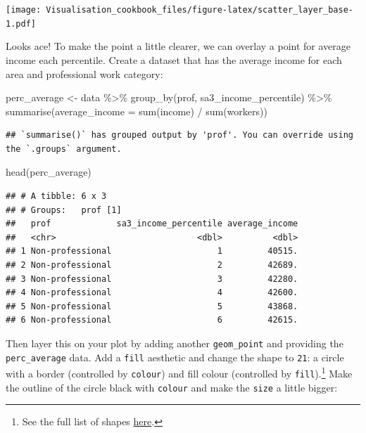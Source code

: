 \documentclass[
]{book}
\newenvironment{Shaded}{\begin{snugshade}}{\end{snugshade}}
\newcommand{\AttributeTok}[1]{\textcolor[rgb]{0.77,0.63,0.00}{#1}}
\newcommand{\FunctionTok}[1]{\textcolor[rgb]{0.00,0.00,0.00}{#1}}
\newcommand{\NormalTok}[1]{#1}
\newcommand{\OtherTok}[1]{\textcolor[rgb]{0.56,0.35,0.01}{#1}}
\newcommand{\SpecialCharTok}[1]{\textcolor[rgb]{0.00,0.00,0.00}{#1}}
\begin{document}
\texttt{[image: Visualisation\_cookbook\_files/figure-latex/scatter\_layer\_base-1.pdf]}

Looks ace! To make the point a little clearer, we can overlay a point for average income each percentile. Create a dataset that has the average income for each area and professional work category:

\begin{Shaded}
\begin{Highlighting}[]
\NormalTok{perc\_average }\OtherTok{\textless{}{-}}\NormalTok{ data }\SpecialCharTok{\%\textgreater{}\%} 
  \FunctionTok{group\_by}\NormalTok{(prof, sa3\_income\_percentile) }\SpecialCharTok{\%\textgreater{}\%} 
  \FunctionTok{summarise}\NormalTok{(}\AttributeTok{average\_income =} \FunctionTok{sum}\NormalTok{(income) }\SpecialCharTok{/} \FunctionTok{sum}\NormalTok{(workers))}
\end{Highlighting}
\end{Shaded}

\begin{verbatim}
## `summarise()` has grouped output by 'prof'. You can override using the `.groups` argument.
\end{verbatim}

\begin{Shaded}
\begin{Highlighting}[]
\FunctionTok{head}\NormalTok{(perc\_average)}
\end{Highlighting}
\end{Shaded}

\begin{verbatim}
## # A tibble: 6 x 3
## # Groups:   prof [1]
##   prof             sa3_income_percentile average_income
##   <chr>                            <dbl>          <dbl>
## 1 Non-professional                     1         40515.
## 2 Non-professional                     2         42689.
## 3 Non-professional                     3         42280.
## 4 Non-professional                     4         42600.
## 5 Non-professional                     5         43868.
## 6 Non-professional                     6         42615.
\end{verbatim}

Then layer this on your plot by adding another \texttt{geom\_point} and providing the \texttt{perc\_average} data. Add a \texttt{fill} aesthetic and change the shape to \texttt{21}: a circle with a border (controlled by \texttt{colour}) and fill colour (controlled by \texttt{fill}).\footnote{See the full list of shapes \href{https://ggplot2.tidyverse.org/reference/scale_shape.html}{here}.}
Make the outline of the circle black with \texttt{colour} and make the \texttt{size} a little bigger:
\end{document}
